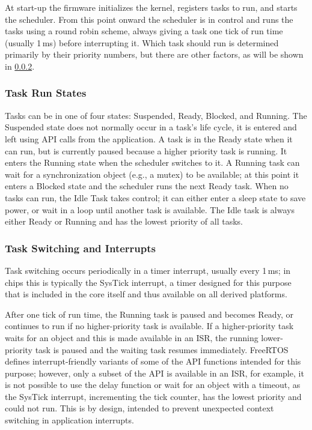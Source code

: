 At start-up the firmware initializes the kernel, registers tasks to run, and starts the scheduler. From this point onward the scheduler is in control and runs the tasks using a round robin scheme, always giving a task one tick of run time (usually 1\,ms) before interrupting it. Which task should run is determined primarily by their priority numbers, but there are other factors, as will be shown in \cref{sec:task-switching}.

\subsubsection{Task Run States}

Tasks can be in one of four states: Suspended, Ready, Blocked, and Running. The Suspended state does not normally occur in a task's life cycle, it is entered and left using API calls from the application. A task is in the Ready state when it can run, but is currently paused because a higher priority task is running. It enters the Running state when the scheduler switches to it. A Running task can wait for a synchronization object (e.g., a mutex) to be available; at this point it enters a Blocked state and the scheduler runs the next Ready task. When no tasks can run, the Idle Task takes control; it can either enter a sleep state to save power, or wait in a loop until another task is available. The Idle task is always either Ready or Running and has the lowest priority of all tasks.

\subsubsection{Task Switching and Interrupts} \label{sec:task-switching}

Task switching occurs periodically in a timer interrupt, usually every 1\,ms; in \armcm chips this is typically the SysTick interrupt, a timer designed for this purpose that is included in the core itself and thus available on all derived platforms.

After one tick of run time, the Running task is paused and becomes Ready, or continues to run if no higher-priority task is available. If a higher-priority task waits for an object and this is made available in an \gls{ISR}, the running lower-priority task is paused and the waiting task resumes immediately. FreeRTOS defines interrupt-friendly variants of some of the \gls{API} functions intended for this purpose; however, only a subset of the \gls{API} is available in an \gls{ISR}, for example, it is not possible to use the delay function or wait for an object with a timeout, as the SysTick interrupt, incrementing the tick counter, has the lowest priority and could not run. This is by design, intended to prevent unexpected context switching in application interrupts.

